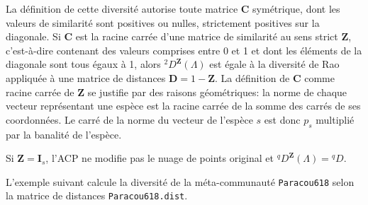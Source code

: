 \documentclass[
  11pt,
  french,
  a4paper,
  extrafontsizes,onecolumn,openright
  ]{memoir}
\newenvironment{Shaded}{\begin{snugshade}}{\end{snugshade}}
\newcommand{\CommentTok}[1]{\textcolor[rgb]{0.56,0.35,0.01}{\textit{#1}}}
\newcommand{\DecValTok}[1]{\textcolor[rgb]{0.00,0.00,0.81}{#1}}
\newcommand{\FunctionTok}[1]{\textcolor[rgb]{0.13,0.29,0.53}{\textbf{#1}}}
\newcommand{\NormalTok}[1]{#1}
\newcommand{\OtherTok}[1]{\textcolor[rgb]{0.56,0.35,0.01}{#1}}
\newcommand{\SpecialCharTok}[1]{\textcolor[rgb]{0.81,0.36,0.00}{\textbf{#1}}}
\begin{document}
La définition de cette diversité autorise toute matrice \(\mathbf{C}\) symétrique, dont les valeurs de similarité sont positives ou nulles, strictement positives sur la diagonale.
Si \(\mathbf{C}\) est la racine carrée d'une matrice de similarité au sens strict \(\mathbf{Z}\), c'est-à-dire contenant des valeurs comprises entre 0 et 1 et dont les éléments de la diagonale sont tous égaux à 1, alors \(^2\!D^{\mathbf{Z}}(\Lambda)\) est égale à la diversité de Rao appliquée à une matrice de distances \(\mathbf{D}=1-\mathbf{Z}\).
La définition de \(\mathbf{C}\) comme racine carrée de \(\mathbf{Z}\) se justifie par des raisons géométriques: la norme de chaque vecteur représentant une espèce est la racine carrée de la somme des carrés de ses coordonnées.
Le carré de la norme du vecteur de l'espèce \(s\) est donc \(p_s\) multiplié par la banalité de l'espèce.

Si \(\mathbf{Z}=\mathbf{I}_s\), l'ACP ne modifie pas le nuage de points original et \(^q\!D^{\mathbf{Z}}(\Lambda)={^{q}\!D}\).

L'exemple suivant calcule la diversité de la méta-communauté \texttt{Paracou618} selon la matrice de distances \texttt{Paracou618.dist}.

\scriptsize

\begin{Shaded}
\end{Shaded}
\end{document}
